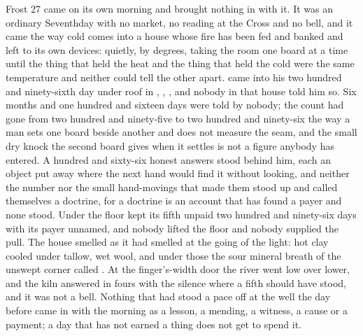 
Frost 27 came on its own morning and brought nothing in with it. It was an ordinary Seventhday with no market, no reading at the Cross and no bell, and it came the way cold comes into a house whose fire has been fed and banked and left to its own devices: quietly, by degrees, taking the room one board at a time until the thing that held the heat and the thing that held the cold were the same temperature and neither could tell the other apart.  came into his two hundred and ninety-sixth day under  roof in , , , and nobody in that house told him so. Six months and one hundred and sixteen days were told by nobody; the count had gone from two hundred and ninety-five to two hundred and ninety-six the way a man sets one board beside another and does not measure the seam, and the small dry knock the second board gives when it settles is not a figure anybody has entered. A hundred and sixty-six honest answers stood behind him, each an object put away where the next hand would find it without looking, and neither the number nor the small hand-movings that made them stood up and called themselves a doctrine, for a doctrine is an account that has found a payer and none stood. Under the floor  kept its fifth unpaid two hundred and ninety-six days with its payer unnamed, and nobody lifted the floor and nobody supplied the pull. The house smelled as it had smelled at the going of the light: hot clay cooled under tallow, wet wool, and under those the sour mineral breath of the unswept corner called . At the finger's-width door the river went low over lower, and the kiln answered in fours with the silence where a fifth should have stood, and it was not a bell. Nothing that had stood a pace off at the well the day before came in with the morning as a lesson, a mending, a witness, a cause or a payment; a day that has not earned a thing does not get to spend it.

